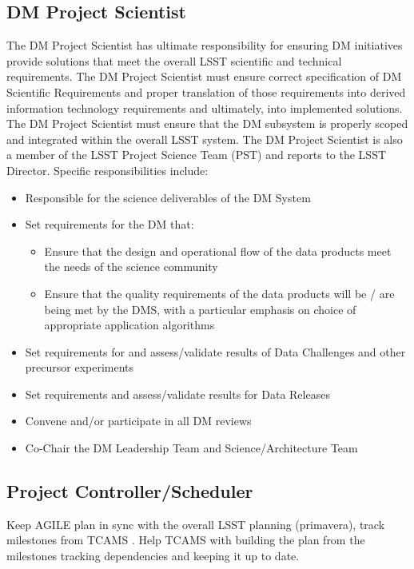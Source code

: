 \subsection{DM Project Scientist \label{role:dmps} }
The DM Project Scientist has ultimate responsibility for ensuring DM initiatives provide solutions that meet the overall LSST scientific and technical requirements.  The DM Project Scientist must ensure correct specification of DM Scientific Requirements and proper translation of those requirements into derived information technology requirements and ultimately, into implemented solutions.  The DM Project Scientist must ensure that the DM subsystem is properly scoped and integrated within the overall LSST system.  The DM Project Scientist is also a member of the LSST Project Science Team (PST) and reports to the LSST Director. Specific responsibilities include:

\begin{itemize}
\item Responsible for the science deliverables of the DM System
\item Set requirements for the DM that:
\begin{itemize}
\item Ensure that the design and operational flow of the data products meet the needs of the science community
\item Ensure that the quality requirements of the data products will be / are being met by the DMS, with a particular emphasis on choice of appropriate application algorithms
\end{itemize}
\item Set requirements for and assess/validate results of Data Challenges and other precursor experiments
\item Set requirements and assess/validate results for Data Releases
\item Convene and/or participate in all DM reviews
\item Co-Chair the DM Leadership Team and Science/Architecture Team
\end{itemize}

\subsection{ Project Controller/Scheduler \label{role:pcon}}
Keep AGILE plan in sync with the overall LSST planning (primavera), track milestones from TCAMS . 
Help TCAMS with building the plan from the milestones tracking dependencies and keeping it up to date. 

